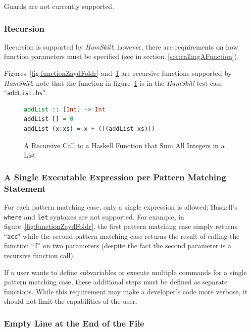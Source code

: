 \documentclass{report}
\begin{document}
Guards are not currently supported.


\subsubsection{Recursion}

Recursion is supported by \textit{HamSkill}; however, there are requirements on how function parameters must be specified (see in section~\ref{sec:callingAFunction}).

Figures~\ref{fig:functionZaydFoldr} and~\ref{fig:functionAddList} are recursive functions supported by \textit{HamSkill}; note that the function in figure~\ref{fig:functionAddList} is in the \textit{HamSkill} test case ``\texttt{addList.hs}".

\begin{figure}[H]
\begin{mdframed}
\begin{lstlisting}[language=Haskell]
addList :: [Int] -> Int
addList [] = 0
addList (x:xs) = x + (((addList xs)))
\end{lstlisting}
\end{mdframed}
\caption{A Recursive Call to a Haskell Function that Sum All Integers in a List}\label{fig:functionAddList}
\end{figure}

\subsubsection{A Single Executable Expression per Pattern Matching Statement}

For each pattern matching case, only a single expression is allowed; Haskell's \texttt{where} and \texttt{let} syntaxes are not supported.  For example, in figure~\ref{fig:functionZaydFoldr}, the first pattern matching case simply returns ``\texttt{acc}" while the second pattern matching case returns the result of calling the function ``\texttt{f}" on two parameters (despite the fact the second parameter is a recursive function call).

If a user wants to define subvariables or execute multiple commands for a single pattern matching case, these additional steps must be defined as separate functions.  While this requirement may make a developer's code more verbose, it should not limit the capabilities of the user.

\subsubsection{Empty Line at the End of the File}
\end{document}
